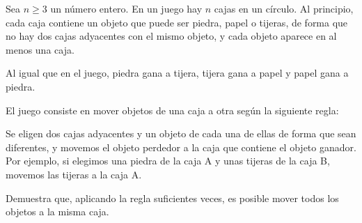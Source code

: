 Sea $n\ge 3$ un número entero. En un juego hay $n$ cajas en un círculo. Al principio, cada caja contiene un objeto que puede ser piedra, papel o tijeras, de forma que no hay dos cajas adyacentes con el mismo objeto, y cada objeto aparece en al menos una caja. 

Al igual que en el juego, piedra gana a tijera, tijera gana a papel y papel gana a piedra.   

El juego consiste en mover objetos de una caja a otra según la siguiente regla:  

Se eligen dos cajas adyacentes y un objeto de cada una de ellas de forma que sean diferentes, y movemos el objeto perdedor a la caja que contiene el objeto ganador. Por ejemplo, si elegimos una piedra de la caja A y unas tijeras de la caja B, movemos las tijeras a la caja A. 

Demuestra que, aplicando la regla suficientes veces, es posible mover todos los objetos a la misma caja.
